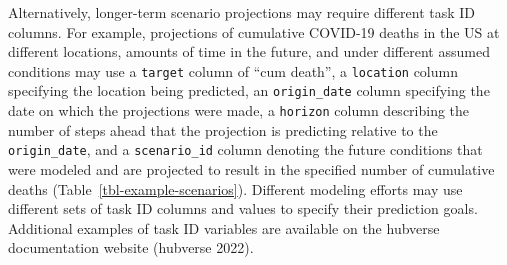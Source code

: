 \documentclass[
]{article}
\begin{document}
Alternatively, longer-term scenario projections may require different
task ID columns. For example, projections of cumulative COVID-19 deaths
in the US at different locations, amounts of time in the future, and
under different assumed conditions may use a \texttt{target} column of
``cum death'', a \texttt{location} column specifying the location being
predicted, an \texttt{origin\_date} column specifying the date on which
the projections were made, a \texttt{horizon} column describing the
number of steps ahead that the projection is predicting relative to the
\texttt{origin\_date}, and a \texttt{scenario\_id} column denoting the
future conditions that were modeled and are projected to result in the
specified number of cumulative deaths
(Table~\ref{tbl-example-scenarios}). Different modeling efforts may use
different sets of task ID columns and values to specify their prediction
goals. Additional examples of task ID variables are available on the
hubverse documentation website (hubverse 2022).
\end{document}
